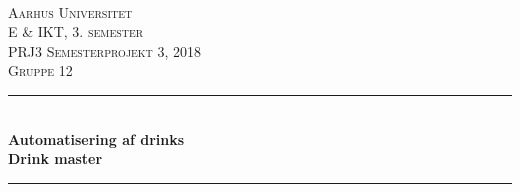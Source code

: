 

\usepackage[utf8]{inputenc}
\usepackage[table,xcdraw]{xcolor}
\usepackage{float}
\usepackage{graphicx}
\usepackage{placeins}
\TabPositions{4cm, 6cm, 8cm}




\newcommand{\HRule}{\rule{\linewidth}{0.5mm}} %

\begin{center}%
 

\textsc{\\[1cm]\LARGE Aarhus Universitet}\\[1cm] %
\textsc{\Large E \& IKT, 3. semester}\\[0.5cm] %
\textsc{\large PRJ3 Semesterprojekt 3, 2018}\\[0.5cm] %
\textsc{\large Gruppe 12}\\[0.5cm] %


\HRule \\[0.5cm]
{ \huge \bfseries Automatisering af drinks}\\[0.5cm] %
{ \textbf{\Large Drink master}} %
\HRule \\[1cm]

\vfill %
\end{center}
\frontmatter
\tableofcontents*
\mainmatter









%
\cite{ref1}


\printbibliography

